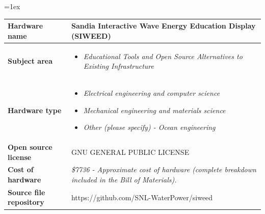 \documentclass[11pt, letterpaper]{article}
\begin{document}
\begin{flushleft}
\tabulinesep=1ex
\begin{tabu} to \linewidth {|X|X[3,l]|}
\hline  \textbf{Hardware name} & Sandia Interactive Wave Energy Education Display (SIWEED)
  \\
  \hline \textbf{Subject area} & %
  \begin{itemize}
  \item \textit{Educational Tools and Open Source Alternatives to Existing Infrastructure}
  \end{itemize}
  \\
  \hline \textbf{Hardware type} &
  \begin{itemize}
  \item \textit{Electrical engineering and computer science}
  \item \textit{Mechanical engineering and materials science}
  \item \textit{Other (please specify) - Ocean engineering}
  \end{itemize}
  \\ 
\hline \textbf{Open source license} &
  GNU GENERAL PUBLIC LICENSE
  \\
\hline \textbf{Cost of hardware} &
  \textit{\$7736 - Approximate cost of hardware (complete breakdown included in the Bill of Materials).}
  \\
\hline \textbf{Source file repository} & 
  https://github.com/SNL-WaterPower/siweed
\\\hline
\end{tabu}
 
\end{flushleft}
\end{document}

